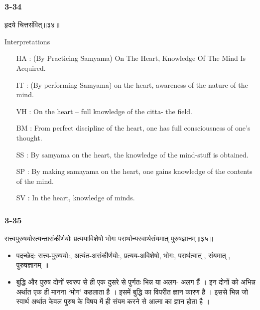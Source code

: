 \begin{frame}[fragile]\frametitle{3-34}
\begin{sanskrit}
हृदये चित्तसंवित्॥३४॥
\end{sanskrit}

Interpretations
\begin{itemize}	
\item [HA]: (By Practicing Samyama) On The Heart, Knowledge Of The Mind Is Acquired.
\item [IT]: (By performing Samyama) on the heart, awareness of the nature of the mind.
\item [VH]: On the heart – full knowledge of the citta- the field.
\item [BM]: From perfect discipline of the heart, one has full consciousness of one’s thought.
\item [SS]: By samyama on the heart, the knowledge of the mind-stuff is obtained.
\item [SP]: By making samayama on the heart, one gains knowledge of the contents of the mind.
\item [SV]: In the heart, knowledge of minds. 
\end{itemize}
\end{frame}

\begin{frame}[fragile]\frametitle{3-35}
\begin{sanskrit}
सत्त्वपुरुषयोरत्यन्तासंकीर्णयोः प्रत्ययाविशेषो भोगः परार्थान्यस्वार्थसंयमात् पुरुषज्ञानम्॥३५॥
\end{sanskrit}

\begin{itemize}
\item पदच्छेद:  सत्त्व-पुरुषयो:, अत्यंत-असंकीर्णयो:, प्रत्यय-अविशेषो, भोगः, परार्थत्वात् , संयमात् , पुरुषज्ञानम् ॥
\item बुद्धि और पुरुष दोनों स्वरुप से ही एक दुसरे से पुर्णतः भिन्न या अलग- अलग हैं । इन दोनों को अभिन्न अर्थात एक ही मानना ‘भोग’ कहलाता है । इसमें बुद्धि का विपरीत ज्ञान कारण है । इससे भिन्न जो स्वार्थ अर्थात केवल पुरुष के विषय में ही संयम करने से आत्मा का ज्ञान होता है ।
\end{itemize}
\end{frame}



